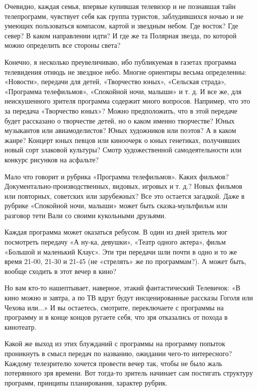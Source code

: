 \documentclass[12pt, a4paper, openany]{book}
\begin{document}
Очевидно, каждая семья, впервые купившая телевизор и не познавшая тайн телепрограмм, чувствует себя как группа туристов, заблудившихся ночью и не умеющих пользоваться компасом, картой и звездным небом. Где восток? Где север? В каком направлении идти? И где же та Полярная звезда, по которой можно определить все стороны света?

Конечно, я несколько преувеличиваю, ибо публикуемая в газетах программа телевидения отнюдь не звездное небо. Многие ориентиры весьма определенны: «Новости», передачи для детей, «Творчество юных», «Сельская страда», «Программа телефильмов», «Спокойной ночи, малыши» и т. д. И все же, для неискушенного зрителя программа содержит много вопросов. Например, что это за передача «Творчество юных»? Можно предположить, что в этой передаче будет рассказано о творчестве детей, но о каком именно творчестве? Юных музыкантов или авиамоделистов? Юных художников или поэтов? А в каком жанре? Концерт юных певцов или киноочерк о юных генетиках, получивших новый сорт злаковой культуры? Смотр художественной самодеятельности или конкурс рисунков на асфальте? 

Мало что говорит и рубрика «Программа телефильмов». Каких фильмов? Документально-производственных, видовых, игровых и т. д.? Новых фильмов или повторных, советских или зарубежных? Все это остается загадкой. Даже в рубрике «Спокойной ночи, малыши» может быть сказка-мультфильм или разговор тети Вали со своими кукольными друзьями. 

Каждая программа может оказаться ребусом. В один из дней зритель мог посмотреть передачу «А ну-ка, девушки», «Театр одного актера», фильм «Большой и маленький Клаус». Эти три передачи шли почти в одно и то же время 21-00, 21-30 и 21-45 (не «стрелять» же по программам?). А может быть, вообще сходить в этот вечер в кино? 

Но вам кто-то нашептывает, наверное, этакий фантастический Телевичок: «В кино можно и завтра, а по ТВ вдруг будут инсценированные рассказы Гоголя или Чехова или...» И вы остаетесь, смотрите, переключаете с программы на программу и в конце концов ругаете себя, что зря отказались от похода в кинотеатр. 

Какой же выход из этих блужданий с программы на программу попыток проникнуть в смысл передач по названию, ожидании чего-то интересного? Каждому телезрителю хочется провести вечер так, чтобы не было жаль потерянного зря времени. Вот тогда-то зритель начинает сам постигать структуру программ, принципы планирования, характер рубрик. 
\end{document}
